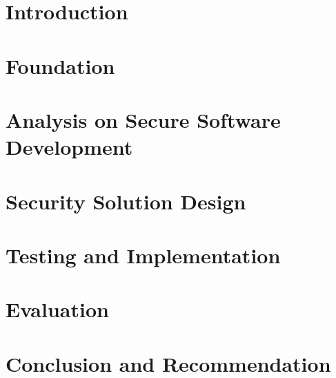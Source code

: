 \documentclass[12pt]{report}
\begin{document}
% 







\tableofcontents
\listoffigures

\chapter{Introduction}





\chapter{\centeringTheoretical Foundation}\label{chap:2}






\chapter{Analysis on Secure Software Development}\label{chap:3}


\chapter{Security Solution Design}


\chapter{Testing and Implementation}


\chapter{Evaluation}



\chapter{Conclusion and Recommendation}


\printbibliography
\end{document}
